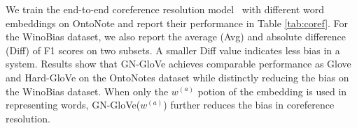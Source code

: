 We train the end-to-end coreference resolution model~\cite{lee2017end} with different word embeddings on OntoNote and report their performance in Table \ref{tab:coref}.
For the WinoBias dataset, we also report the average (Avg) and absolute difference (Diff) of F1 scores on two subsets. A smaller Diff value indicates less bias in a system.
Results show that GN-GloVe achieves comparable performance as Glove and Hard-GloVe on the OntoNotes dataset while distinctly reducing the bias on the WinoBias dataset. 
When only the $w^{(a)}$ potion of the embedding is used in representing words, GN-GloVe($w^{(a)}$) further reduces the bias in coreference resolution. 


\begin{table}
\centering
{}
\caption{F1 score (\%) on the coreference system. %
}
\vspace{-10pt}
\label{tab:coref}
\end{table}


